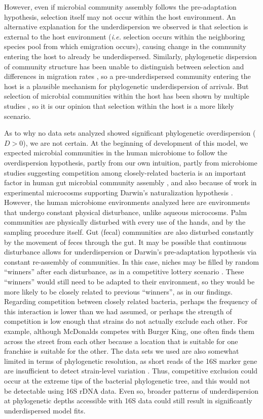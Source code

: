 \documentclass{article}
\begin{document}
\par
However, even if microbial community assembly follows the pre-adaptation hypothesis, selection itself may not occur within the host environment. An alternative explanation for the underdispersion we observed is that selection is external to the host environment (\emph{i.e.} selection occurs within the neighboring species pool from which emigration occurs), causing change in the community entering the host to already be underdispersed. Similarly, phylogenetic dispersion of community structure has been unable to distinguish between selection and differences in migration rates \cite{Emerson2008}, so a pre-underdispersed community entering the host is a plausible mechanism for phylogenetic underdispersion of arrivals. But selection of microbial communities within the host has been shown by multiple studies \cite{Peterfreund2012,David2014,Kennedy2016}, so it is our opinion that selection within the host is a more likely scenario.
\par
As to why no data sets analyzed showed significant phylogenetic overdispersion (\(D > 0\)), we are not certain. At the beginning of development of this model, we expected microbial communities in the human microbiome to follow the overdispersion hypothesis, partly from our own intuition, partly from microbiome studies suggesting competition among closely-related bacteria is an important factor in human gut microbial community assembly \cite{Chatzidaki-Livanis3627,Hecht1281}, and also because of work in experimental microcosms supporting Darwin’s naturalization hypothesis \cite{Peay2012}. However, the human microbiome environments analyzed here are environments that undergo constant physical disturbance, unlike aqueous microcosms. Palm communities are physically disturbed with every use of the hands, and by the sampling procedure itself. Gut (fecal) communities are also disturbed constantly by the movement of feces through the gut. It may be possible that continuous disturbance allows for underdispersion or Darwin’s pre-adaptation hypothesis via constant re-assembly of communities. In this case, niches may be filled by random “winners” after each disturbance, as in a competitive lottery scenario \cite{Verster2018}. These “winners” would still need to be adapted to their environment, so they would be more likely to be closely related to previous “winners”, as in our findings. Regarding competition between closely related bacteria, perhaps the frequency of this interaction is lower than we had assumed, or perhaps the strength of competition is low enough that strains do not actually exclude each other. For example, although McDonalds competes with Burger King, one often finds them across the street from each other because a location that is suitable for one franchise is suitable for the other. The data sets we used are also somewhat limited in terms of phylogenetic resolution, as short reads of the 16S marker gene are insufficient to detect strain-level variation \cite{Morowitz1128,Hecht1281,Tett2019}. Thus, competitive exclusion could occur at the extreme tips of the bacterial phylogenetic tree, and this would not be detectable using 16S rDNA data. Even so, broader patterns of underdispersion at phylogenetic depths accessible with 16S data could still result in significantly underdispersed model fits.
\end{document}
